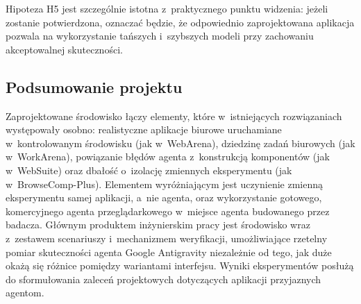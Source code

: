 Hipoteza H5 jest szczególnie istotna z~praktycznego punktu widzenia: jeżeli zostanie potwierdzona, oznaczać będzie, że odpowiednio zaprojektowana aplikacja pozwala na wykorzystanie tańszych i~szybszych modeli przy zachowaniu akceptowalnej skuteczności.

\subsection{Podsumowanie projektu}
\label{sec:podsumowanie-projektu}
Zaprojektowane środowisko łączy elementy, które w~istniejących rozwiązaniach występowały osobno: realistyczne aplikacje biurowe uruchamiane w~kontrolowanym środowisku (jak w~WebArena), dziedzinę zadań biurowych (jak w~WorkArena), powiązanie błędów agenta z~konstrukcją komponentów (jak w~WebSuite) oraz dbałość o~izolację zmiennych eksperymentu (jak w~BrowseComp-Plus). Elementem wyróżniającym jest uczynienie zmienną eksperymentu samej aplikacji, a~nie agenta, oraz wykorzystanie gotowego, komercyjnego agenta przeglądarkowego w~miejsce agenta budowanego przez badacza. Głównym produktem inżynierskim pracy jest środowisko wraz z~zestawem scenariuszy i~mechanizmem weryfikacji, umożliwiające rzetelny pomiar skuteczności agenta Google Antigravity niezależnie od tego, jak duże okażą się różnice pomiędzy wariantami interfejsu. Wyniki eksperymentów posłużą do sformułowania zaleceń projektowych dotyczących aplikacji przyjaznych agentom.

